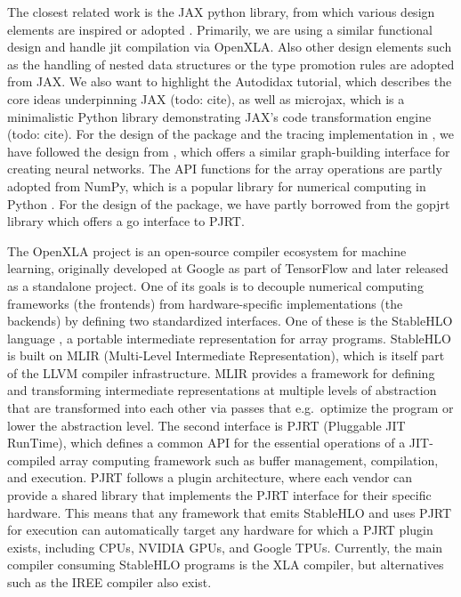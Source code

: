 The closest related work is the JAX python library, from which various design elements are inspired or adopted \citep{ref-jax}.
Primarily, we are using a similar functional design and handle jit compilation via OpenXLA.
Also other design elements such as the handling of nested data structures or the type promotion rules are adopted from JAX.
We also want to highlight the Autodidax tutorial, which describes the core ideas underpinning JAX (todo: cite), as well as microjax, which is a minimalistic Python library demonstrating JAX's code transformation engine (todo: cite).
For the design of the  package and the tracing implementation in , we have followed the design from , which offers a similar graph-building interface for creating neural networks.
The API functions for the array operations are partly adopted from NumPy, which is a popular library for numerical computing in Python \citep{ref-harris2020array}.
For the design of the  package, we have partly borrowed from the gopjrt library \citep{ref-gopjrt} which offers a go interface to PJRT.

The OpenXLA project \citep{ref-openxla} is an open-source compiler ecosystem for machine learning, originally developed at Google as part of TensorFlow and later released as a standalone project.
One of its goals is to decouple numerical computing frameworks (the frontends) from hardware-specific implementations (the backends) by defining two standardized interfaces.
One of these is the StableHLO language \citep{ref-stablehlo}, a portable intermediate representation for array programs.
StableHLO is built on MLIR (Multi-Level Intermediate Representation), which is itself part of the LLVM compiler infrastructure.
MLIR provides a framework for defining and transforming intermediate representations at multiple levels of abstraction that are transformed into each other via passes that e.g.~optimize the program or lower the abstraction level.
The second interface is PJRT (Pluggable JIT RunTime), which defines a common API for the essential operations of a JIT-compiled array computing framework such as buffer management, compilation, and execution.
PJRT follows a plugin architecture, where each vendor can provide a shared library that implements the PJRT interface for their specific hardware.
This means that any framework that emits StableHLO and uses PJRT for execution can automatically target any hardware for which a PJRT plugin exists, including CPUs, NVIDIA GPUs, and Google TPUs.
Currently, the main compiler consuming StableHLO programs is the XLA compiler, but alternatives such as the IREE compiler \citep{ref-iree} also exist.

